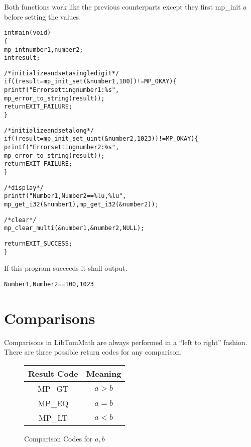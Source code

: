 \documentclass[synpaper]{book}
\begin{document}
Both functions work like the previous counterparts except they first mp\_init $a$ before setting the values.

\begin{alltt}
int main(void)
\{
   mp_int number1, number2;
   int    result;

   /* initialize and set a single digit */
   if ((result = mp_init_set(&number1, 100)) != MP_OKAY) \{
      printf("Error setting number1: \%s",
             mp_error_to_string(result));
      return EXIT_FAILURE;
   \}

   /* initialize and set a long */
   if ((result = mp_init_set_uint(&number2, 1023)) != MP_OKAY) \{
      printf("Error setting number2: \%s",
             mp_error_to_string(result));
      return EXIT_FAILURE;
   \}

   /* display */
   printf("Number1, Number2 == \%lu, \%lu",
          mp_get_i32(&number1), mp_get_i32(&number2));

   /* clear */
   mp_clear_multi(&number1, &number2, NULL);

   return EXIT_SUCCESS;
\}
\end{alltt}

If this program succeeds it shall output.
\begin{alltt}
Number1, Number2 == 100, 1023
\end{alltt}

\section{Comparisons}

Comparisons in LibTomMath are always performed in a ``left to right'' fashion.  There are three possible return codes
for any comparison.

  
\begin{figure}[h]
\begin{center}
\begin{tabular}{|c|c|}
\hline \textbf{Result Code} & \textbf{Meaning} \\
\hline MP\_GT & $a > b$ \\
\hline MP\_EQ & $a = b$ \\
\hline MP\_LT & $a < b$ \\
\hline
\end{tabular}
\end{center}
\caption{Comparison Codes for $a, b$}
\label{fig:CMP}
\end{figure}
\end{document}

